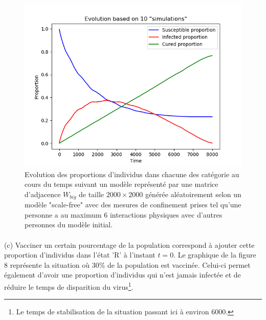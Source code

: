 \documentclass[a4paper, 12pt, oneside]{article}
\begin{document}
\begin{figure}[H]
	\centering
	\includegraphics[scale=1]{Wbig_dense_containment.png} 
	\caption{Evolution des proportions d'individus dans chacune des catégorie au cours du temps suivant un modèle représenté par une matrice d'adjacence $W_{big}$ de taille $2000 \times 2000$ générée aléatoirement selon un modèle "scale-free" avec des mesures de confinement prises tel qu'une personne a au maximum 6 interactions physiques avec d'autres personnes du modèle initial.}
\end{figure}

\paragraph{}(c) Vacciner un certain pourcentage de la population correspond à ajouter cette proportion d'individus dans l'état 'R' à l'instant $t = 0$. Le graphique de la figure 8 représente la situation où 30\% de la population est vaccinée. Celui-ci permet également d'avoir une proportion d'individus qui n'est jamais infectée et de réduire le temps de disparition du virus\footnote{Le temps de stabilisation de la situation passant ici à environ 6000.}.
\end{document}
